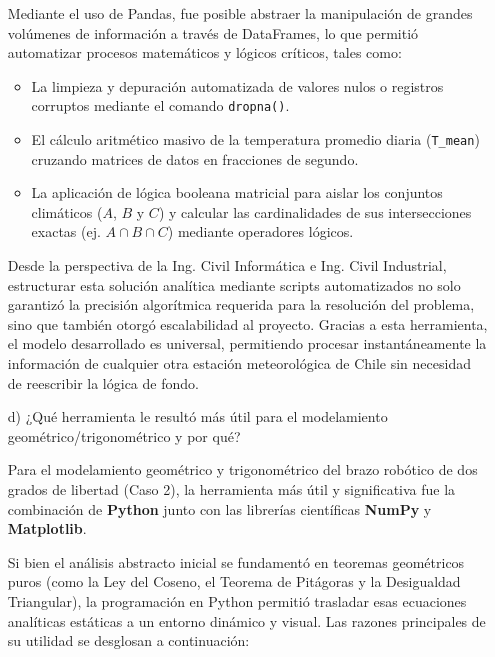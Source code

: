 \documentclass[12pt]{article}
\begin{document}
\begin{itemize}
Mediante el uso de Pandas, fue posible abstraer la manipulación de grandes volúmenes de información a través de DataFrames, lo que permitió automatizar procesos matemáticos y lógicos críticos, tales como:
\begin{itemize}
    \item La limpieza y depuración automatizada de valores nulos o registros corruptos mediante el comando \texttt{dropna()}.
    \item El cálculo aritmético masivo de la temperatura promedio diaria (\texttt{T\_mean}) cruzando matrices de datos en fracciones de segundo.
    \item La aplicación de lógica booleana matricial para aislar los conjuntos climáticos ($A$, $B$ y $C$) y calcular las cardinalidades de sus intersecciones exactas (ej. $A \cap B \cap C$) mediante operadores lógicos.
\end{itemize}

Desde la perspectiva de la Ing. Civil Informática e Ing. Civil Industrial, estructurar esta solución analítica mediante scripts automatizados no solo garantizó la precisión algorítmica requerida para la resolución del problema, sino que también otorgó escalabilidad al proyecto. Gracias a esta herramienta, el modelo desarrollado es universal, permitiendo procesar instantáneamente la información de cualquier otra estación meteorológica de Chile sin necesidad de reescribir la lógica de fondo.
\newpage
	\item[d)] ¿Qué herramienta le resultó más útil para el modelamiento geométrico/trigonométrico y por qué?
	
	Para el modelamiento geométrico y trigonométrico del brazo robótico de dos grados de libertad (Caso 2), la herramienta más útil y significativa fue la combinación de \textbf{Python} junto con las librerías científicas \textbf{NumPy} y \textbf{Matplotlib}.

Si bien el análisis abstracto inicial se fundamentó en teoremas geométricos puros (como la Ley del Coseno, el Teorema de Pitágoras y la Desigualdad Triangular), la programación en Python permitió trasladar esas ecuaciones analíticas estáticas a un entorno dinámico y visual. Las razones principales de su utilidad se desglosan a continuación:


\end{itemize}
\end{document}

